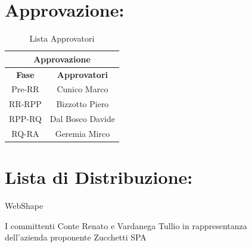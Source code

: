 \section*{\LARGE Approvazione:}
\begin{table}[!h]
  \begin{center}
    \begin{tabular}
      {|c|c|}
      \hline
      \multicolumn{2}{|c|}{ \textbf{Approvazione} } \\
      \hline
      \textbf{Fase} & \textbf{Approvatori} \\
      \hline
      Pre-RR & Cunico Marco\\
                 
      \hline
      RR-RPP & Bizzotto Piero \\
                  
      \hline
      RPP-RQ & Dal Bosco Davide \\
                  
      \hline
      RQ-RA & Geremia Mirco \\
                  
      \hline

    \end{tabular}
    \caption{Lista Approvatori} %
    \label{tabapprovazione}
  \end{center}
\end{table} 
 
\section*{\LARGE Lista di Distribuzione:}
 
  \begin{elenconumerato}{\normindent}
    \item WebShape
    \item I committenti Conte Renato e Vardanega Tullio in rappresentanza \\ dell'azienda proponente Zucchetti SPA
  \end{elenconumerato}
 
\newpage
 
 
 
